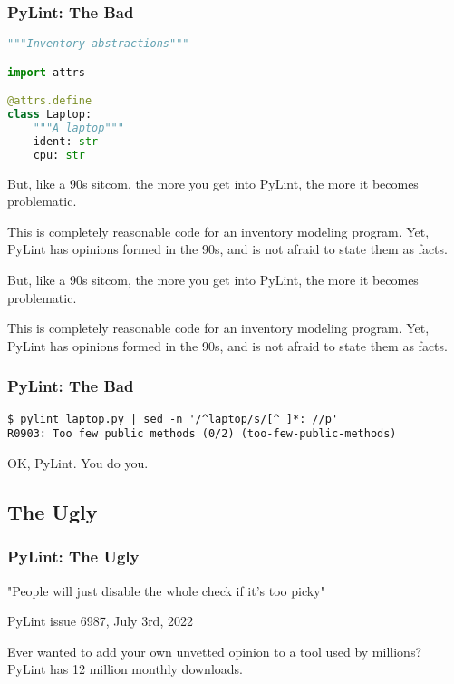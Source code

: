 \documentclass[ignorenonframetext]{beamer}
\begin{document}
\begin{frame}[fragile]
\frametitle{PyLint: The Bad}

\begin{lstlisting}[language=Python]
"""Inventory abstractions"""

import attrs

@attrs.define
class Laptop:
    """A laptop"""
    ident: str
    cpu: str
\end{lstlisting}

\end{frame}

But, like a 90s sitcom, the more you get into PyLint, the more it
becomes problematic.

This is completely reasonable code for an inventory modeling program.
Yet, PyLint has opinions formed in the 90s, and is not afraid to state
them as facts.

But, like a 90s sitcom, the more you get into PyLint, the more it
becomes problematic.

This is completely reasonable code for an inventory modeling program.
Yet, PyLint has opinions formed in the 90s, and is not afraid to state
them as facts.

\begin{frame}[fragile]
\frametitle{PyLint: The Bad}

\begin{lstlisting}
$ pylint laptop.py | sed -n '/^laptop/s/[^ ]*: //p'
R0903: Too few public methods (0/2) (too-few-public-methods)
\end{lstlisting}

\end{frame}

OK, PyLint. You do you.

\hypertarget{the-ugly}{%
\subsection{The Ugly}\label{the-ugly}}

\begin{frame}[fragile]
\frametitle{PyLint: The Ugly}

"People will just disable the whole check if it's too picky"

PyLint issue 6987, July 3rd, 2022

\end{frame}

Ever wanted to add your own unvetted opinion to a tool used by millions?
PyLint has 12 million monthly downloads.
\end{document}
